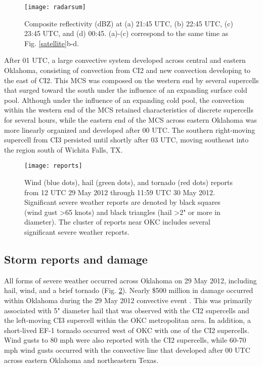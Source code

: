 \begin{figure}
\centering
\texttt{[image: radarsum]}
\caption{Composite reflectivity (dBZ) at (a) 21:45 UTC, (b) 22:45 UTC, (c) 23:45 UTC, and (d) 00:45. (a)-(c) correspond to the same time as Fig. \ref{satellite}b-d.}
\label{radarsummary}
\end{figure}

After 01 UTC, a large convective system developed across central and eastern Oklahoma, consisting of convection from CI2 and new convection developing to the east of CI2. This MCS was composed on the western end by several supercells that surged toward the south under the influence of an expanding surface cold pool. Although under the influence of an expanding cold pool, the convection within the western end of the MCS retained characteristics of discrete supercells for several hours, while the eastern end of the MCS across eastern Oklahoma was more linearly organized and developed after 00 UTC. The southern right-moving supercell from CI3 persisted until shortly after 03 UTC, moving southeast into the region south of Wichita Falls, TX.

\begin{figure}
\centering
\texttt{[image: reports]}
\caption{Wind (blue dots), hail (green dots), and tornado (red dots) reports from 12 UTC 29 May 2012 through 11:59 UTC 30 May 2012. Significant severe weather reports are denoted by black squares (wind gust \textgreater 65 knots) and black triangles (hail \textgreater 2" or more in diameter). The cluster of reports near OKC includes several significant severe weather reports. }
\label{reports}
\end{figure}

\subsection{Storm reports and damage}
All forms of severe weather occurred across Oklahoma on 29 May 2012, including hail, wind, and a brief tornado (Fig. \ref{reports}). Nearly \$500 million in damage occurred within Oklahoma during the 29 May 2012 convective event \citep{ncdc12}. This was primarily associated with 5" diameter hail that was observed with the CI2 supercells and the left-moving CI3 supercell within the OKC metropolitan area. In addition, a short-lived EF-1 tornado occurred west of OKC with one of the CI2 supercells. Wind gusts to 80 mph were also reported with the CI2 supercells, while 60-70 mph wind gusts occurred with the convective line that developed after 00 UTC across eastern Oklahoma and northeastern Texas.

